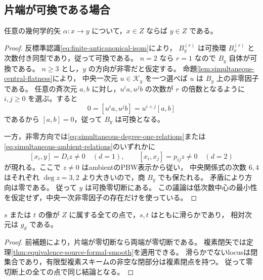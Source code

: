\subsection{片端が可換である場合}

\begin{lemma}[可換零切断の幾何学的飽和性]
\label{lem:commutative-zero-equivalence-saturated}
任意の幾何学的矢 $\alpha:x\to y$ について，$x\in Z$ ならば $y\in Z$ である。
\end{lemma}
\begin{proof}
反標準認識\eqref{eq:finite-anticanonical-isom}により，
$B_y^{(r)}$ は可換環 $B_x^{(r)}$ と次数付き同型であり，従って可換である。
$n=2$ なら $r=1$ なので $B_y$ 自体が可換である。
$n\ge3$ とし，$y$ の方向が非零だと仮定する。
命題\ref{lem:simultaneous-central-flatness}により，
中央一次元 $u\in\mathcal K_y$ を一つ選べば $u$ は $B_y$ 上の非零因子である。
任意の斉次元 $a,b$ に対し，$u^ia,u^jb$ の次数が $r$ の倍数となるように
$i,j\ge0$ を選ぶ。すると
\[
       0=[u^ia,u^jb]=u^{i+j}[a,b]
\]
であるから $[a,b]=0$，従って $B_y$ は可換となる。

一方，非零方向では\eqref{eq:simultaneous-degree-one-relations}または
\eqref{eq:simultaneous-ambient-relations}のいずれかに
\[
 [x_i,y]=D_i z\ne0\quad(d=1),\qquad
 [x_i,x_j]=p_{ij}z\ne0\quad(d=2)
\]
が現れる。ここで $z\ne0$ はambientのPBW表示から従い，
中央関係式の次数 $6,4$ はそれぞれ $\deg z=3,2$ より大きいので，商 $B_y$ でも保たれる。
矛盾により方向は零である。
従って $y$ は可換零切断にある。
この議論は低次数中心の最小性を仮定せず，中央一次非零因子の存在だけを使っている。
\end{proof}

\begin{corollary}\label{cor:source-smooth-over-zero-section}
$s$ または $t$ の像が $Z$ に属する全ての点で，$s,t$ はともに滑らかであり，
相対次元は $g_d$ である。
\end{corollary}
\begin{proof}
前補題により，片端が零切断なら両端が零切断である。
複素閉矢では定理\ref{thm:equivalence-source-formal-smooth}を適用できる。
滑らかでないlocusは閉集合であり，有限型複素スキームの非空な閉部分は複素閉点を持つ。
従って零切断上の全ての点で同じ結論となる。
\end{proof}

